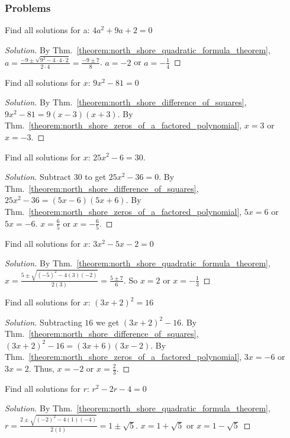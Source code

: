 \documentclass[crop=false,class=article,oneside]{standalone}
\begin{document}
        \subsubsection{Problems}
        \begin{problem}
        Find all solutions for a: $4a^{2}+9a+2=0$
        \end{problem}
        \begin{proof}[Solution]
        By Thm.~\ref{theorem:north_shore_quadratic_formula_theorem}, $a=\frac{-9\pm\sqrt{9^{2}-4\cdot 4\cdot 2}}{2\cdot 4}=\frac{-9\pm 7}{8}$. $a=-2$ or $a=-\frac{1}{4}$
        \end{proof}
        \begin{problem}
        Find all solutions for $x$: $9x^{2}-81=0$
        \end{problem}
        \begin{proof}[Solution]
        By Thm.~\ref{theorem:north_shore_difference_of_squares}, $9x^{2}-81=9(x-3)(x+3)$. By Thm.~\ref{theorem:north_shore_zeros_of_a_factored_polynomial}, $x=3$ or $x=-3$.
        \end{proof}
        \begin{problem}
        Find all solutions for $x$: $25x^{2}-6=30$.
        \end{problem}
        \begin{proof}[Solution]
        Subtract $30$ to get $25x^{2}-36=0$. By Thm.~\ref{theorem:north_shore_difference_of_squares}, $25x^{2}-36 =(5x-6)(5x+6)$. By Thm.~\ref{theorem:north_shore_zeros_of_a_factored_polynomial}, $5x=6$ or $5x=-6$. $x=\frac{6}{5}$ or $x=-\frac{6}{5}$.
        \end{proof}
        \begin{problem}
        Find all solutions for $x$: $3x^{2}-5x-2=0$
        \end{problem}
        \begin{proof}[Solution]
        By Thm.~\ref{theorem:north_shore_quadratic_formula_theorem}, $x=\frac{5\pm\sqrt{(-5)^{2}-4(3)(-2)}}{2(3)}=\frac{5\pm 7}{6}$. So $x=2$ or $x=-\frac{1}{3}$
        \end{proof}
        \begin{problem}
        Find all solutions for $x$: $(3x+2)^{2}=16$
        \end{problem}
        \begin{proof}[Solution]
        Subtracting $16$ we get $(3x+2)^{2}-16$. By Thm.~\ref{theorem:north_shore_difference_of_squares}, $(3x+2)^{2}-16=(3x+6)(3x-2)$. By Thm.~\ref{theorem:north_shore_zeros_of_a_factored_polynomial}, $3x=-6$ or $3x=2$. Thus, $x=-2$ or $x=\frac{2}{3}$.
        \end{proof}
        \begin{problem}
        Find all solutions for $r$: $r^{2}-2r-4=0$
        \end{problem}
        \begin{proof}[Solution]
        By Thm.~\ref{theorem:north_shore_quadratic_formula_theorem}, $r=\frac{2\pm\sqrt{(-2)^{2}-4(1)(-4)}}{2(1)}=1\pm\sqrt{5}$. $x=1+\sqrt{5}$ or $x=1-\sqrt{5}$
        \end{proof}
\end{document}
